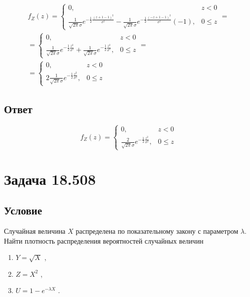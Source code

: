 \begin{multline}
    f_Z(z)
    = \left \{
    \begin{array}{ll}
        0,                                                                                                                                                                                                & z < 0    \\
        \frac{1}{\sqrt{2 \pi} \sigma} e^{-\frac{1}{2} \frac{\left ( z + 1 - 1 \right )^2}{\sigma^2}} - \frac{1}{\sqrt{2 \pi} \sigma} e^{-\frac{1}{2} \frac{\left ( -z + 1 - 1 \right )^2}{\sigma^2}}(-1), & 0 \leq z
    \end{array}
    \right . = \\
    = \left \{
    \begin{array}{ll}
        0,                                                                                                                                         & z < 0    \\
        \frac{1}{\sqrt{2 \pi} \sigma} e^{-\frac{1}{2} \frac{z^2}{\sigma^2}} + \frac{1}{\sqrt{2 \pi} \sigma} e^{-\frac{1}{2} \frac{z^2}{\sigma^2}}, & 0 \leq z
    \end{array}
    \right . = \\
    = \left \{
    \begin{array}{ll}
        0,                                                                     & z < 0    \\
        2 \frac{1}{\sqrt{2 \pi} \sigma} e^{-\frac{1}{2} \frac{z^2}{\sigma^2}}, & 0 \leq z
    \end{array}
    \right .
\end{multline}

\subsection*{Ответ}
$$
f_Z(z)
= \left \{
\begin{array}{ll}
    0,                                                                   & z < 0    \\
    \frac{2}{\sqrt{2 \pi} \sigma} e^{-\frac{1}{2} \frac{z^2}{\sigma^2}}, & 0 \leq z
\end{array}
\right .
$$


\section*{Задача 18.508}
\subsection*{Условие}
Случайная величина $X$ распределена по показательному закону с параметром $\lambda$. Найти плотность распределения вероятностей случайных величин
\begin{enumerate}
    \item $Y = \sqrt{X}$ ,
    \item $Z = X^2$ ,
    \item $U = 1 - e^{-\lambda X}$ .
\end{enumerate}

